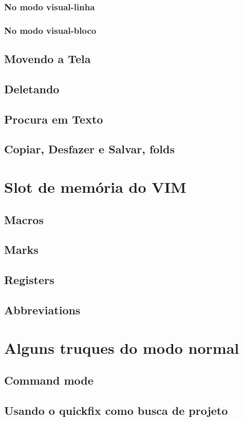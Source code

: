 \documentclass[a4paper, 12pt]{article}
\begin{document}
\subsubsection{No modo visual-linha}
\subsubsection{No modo visual-bloco}
\subsection{Movendo a Tela}
\subsection{Deletando}
\subsection{Procura em Texto}
\subsection{Copiar, Desfazer e Salvar, folds}
\section{Slot de memória do VIM}
\subsection{Macros}
\subsection{Marks}
\subsection{Registers}
\subsection{Abbreviations}
\section{Alguns truques do modo normal}
\subsection{Command mode}
\subsection{Usando o quickfix como busca de projeto}
\end{document}
